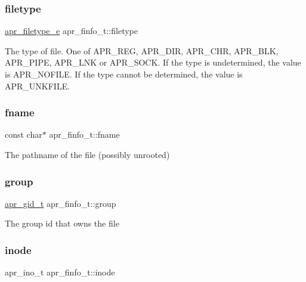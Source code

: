 \subsubsection{\texorpdfstring{filetype}{filetype}}
{\footnotesize\ttfamily \mbox{\hyperlink{group__apr__file__info_gae3f0ce3014337a52b39852f8bf81ca7c}{apr\+\_\+filetype\+\_\+e}} apr\+\_\+finfo\+\_\+t\+::filetype}

The type of file. One of A\+P\+R\+\_\+\+R\+EG, A\+P\+R\+\_\+\+D\+IR, A\+P\+R\+\_\+\+C\+HR, A\+P\+R\+\_\+\+B\+LK, A\+P\+R\+\_\+\+P\+I\+PE, A\+P\+R\+\_\+\+L\+NK or A\+P\+R\+\_\+\+S\+O\+CK. If the type is undetermined, the value is A\+P\+R\+\_\+\+N\+O\+F\+I\+LE. If the type cannot be determined, the value is A\+P\+R\+\_\+\+U\+N\+K\+F\+I\+LE. \mbox{\label{structapr__finfo__t_acfed83ab2943ee7a58a215aa1cfd9e47}} 
\subsubsection{\texorpdfstring{fname}{fname}}
{\footnotesize\ttfamily const char$\ast$ apr\+\_\+finfo\+\_\+t\+::fname}

The pathname of the file (possibly unrooted) \mbox{\label{structapr__finfo__t_a15c9c056330308de4dafb3826a9b02bc}} 
\subsubsection{\texorpdfstring{group}{group}}
{\footnotesize\ttfamily \mbox{\hyperlink{group__apr__user_ga22e9e224e984f837f3e276833e2f3a55}{apr\+\_\+gid\+\_\+t}} apr\+\_\+finfo\+\_\+t\+::group}

The group id that owns the file \mbox{\label{structapr__finfo__t_a73aebb666ddc391d53a871802c27eed6}} 
\subsubsection{\texorpdfstring{inode}{inode}}
{\footnotesize\ttfamily apr\+\_\+ino\+\_\+t apr\+\_\+finfo\+\_\+t\+::inode}


